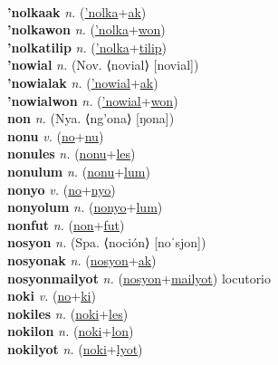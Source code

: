  \label{'nolka} \\
\textbf{'nolkaak} \textit{n.} (\hyperref['nolka]{'nolka}+\hyperref[ak]{ak})
 \label{'nolkaak} \\
\textbf{'nolkawon} \textit{n.} (\hyperref['nolka]{'nolka}+\hyperref[won]{won})
 \label{'nolkawon} \\
\textbf{'nolkatilip} \textit{n.} (\hyperref['nolka]{'nolka}+\hyperref[tilip]{tilip})
 \label{'nolkatilip} \\
\textbf{'nowial} \textit{n.} (Nov. ⟨novial⟩ [novial])
 \label{'nowial} \\
\textbf{'nowialak} \textit{n.} (\hyperref['nowial]{'nowial}+\hyperref[ak]{ak})
 \label{'nowialak} \\
\textbf{'nowialwon} \textit{n.} (\hyperref['nowial]{'nowial}+\hyperref[won]{won})
 \label{'nowialwon} \\
\textbf{non} \textit{n.} (Nya. ⟨ng’ona⟩ [ŋona])
 \label{non} \\
\textbf{nonu} \textit{v.} (\hyperref[no]{no}+\hyperref[nu]{nu})
 \label{nonu} \\
\textbf{nonules} \textit{n.} (\hyperref[nonu]{nonu}+\hyperref[les]{les})
 \label{nonules} \\
\textbf{nonulum} \textit{n.} (\hyperref[nonu]{nonu}+\hyperref[lum]{lum})
 \label{nonulum} \\
\textbf{nonyo} \textit{v.} (\hyperref[no]{no}+\hyperref[nyo]{nyo})
 \label{nonyo} \\
\textbf{nonyolum} \textit{n.} (\hyperref[nonyo]{nonyo}+\hyperref[lum]{lum})
 \label{nonyolum} \\
\textbf{nonfut} \textit{n.} (\hyperref[non]{non}+\hyperref[fut]{fut})
 \label{nonfut} \\
\textbf{nosyon} \textit{n.} (Spa. ⟨noción⟩ [noˈsjon])
 \label{nosyon} \\
\textbf{nosyonak} \textit{n.} (\hyperref[nosyon]{nosyon}+\hyperref[ak]{ak})
 \label{nosyonak} \\
\textbf{nosyonmailyot} \textit{n.} (\hyperref[nosyon]{nosyon}+\hyperref[mailyot]{mailyot})
locutorio \label{nosyonmailyot} \\
\textbf{noki} \textit{v.} (\hyperref[no]{no}+\hyperref[ki]{ki})
 \label{noki} \\
\textbf{nokiles} \textit{n.} (\hyperref[noki]{noki}+\hyperref[les]{les})
 \label{nokiles} \\
\textbf{nokilon} \textit{n.} (\hyperref[noki]{noki}+\hyperref[lon]{lon})
 \label{nokilon} \\
\textbf{nokilyot} \textit{n.} (\hyperref[noki]{noki}+\hyperref[lyot]{lyot})
